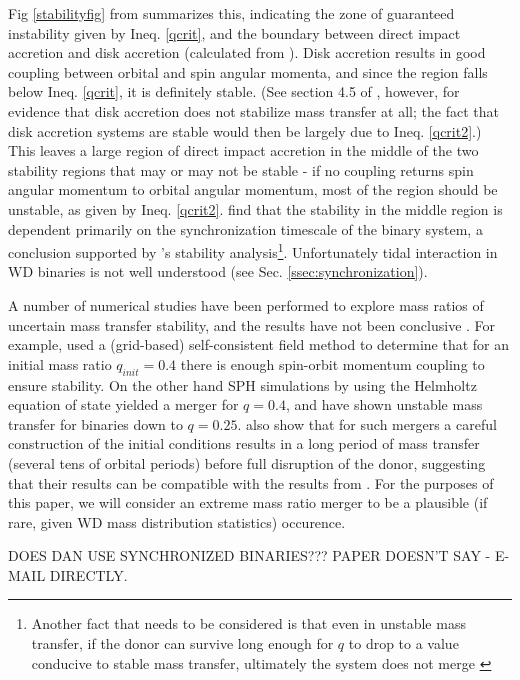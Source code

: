 \noindent Fig \ref{stabilityfig} from \cite{dan+11} summarizes this, indicating the zone of guaranteed instability given by Ineq. \ref{qcrit}, and the boundary between direct impact accretion and disk accretion (calculated from \cite{nele+01}).  Disk accretion results in good coupling between orbital and spin angular momenta, and since the region falls below Ineq. \ref{qcrit}, it is definitely stable.  (See section 4.5 of \citeauthor{marsns04}, however, for evidence that disk accretion does not stabilize mass transfer at all; the fact that disk accretion systems are stable would then be largely due to Ineq. \ref{qcrit2}.)  This leaves a large region of direct impact accretion in the middle of the two stability regions that may or may not be stable - if no coupling returns spin angular momentum to orbital angular momentum, most of the region should be unstable, as given by Ineq. \ref{qcrit2}.  \cite{marsns04} find that the stability in the middle region is dependent primarily on the synchronization timescale of the binary system, a conclusion supported by \cite{gokhpf07}'s stability analysis\footnote{Another fact that needs to be considered is that even in unstable mass transfer, if the donor can survive long enough for $q$ to drop to a value conducive to stable mass transfer, ultimately the system does not merge \citep{gokhpf07}}.  Unfortunately tidal interaction in WD binaries is not well understood (see Sec. \ref{ssec:synchronization}).

A number of numerical studies have been performed to explore mass ratios of uncertain mass transfer stability, and the results have not been conclusive \citep{mars11}.  For example, \cite{motl+07} used a (grid-based) self-consistent field method to determine that for an initial mass ratio $q_{init} = 0.4$ there is enough spin-orbit momentum coupling to ensure stability.  On the other hand SPH simulations by \cite{dan+11} using the Helmholtz equation of state yielded a merger for $q = 0.4$, and have shown unstable mass transfer for binaries down to $q = 0.25$.  \citeauthor{dan+11} also show that for such mergers a careful construction of the initial conditions results in a long period of mass transfer (several tens of orbital periods) before full disruption of the donor, suggesting that their results can be compatible with the results from \citep{motl+07}.  For the purposes of this paper, we will consider an extreme mass ratio merger to be a plausible (if rare, given WD mass distribution statistics) occurence.

DOES DAN USE SYNCHRONIZED BINARIES???  PAPER DOESN'T SAY - E-MAIL DIRECTLY.


